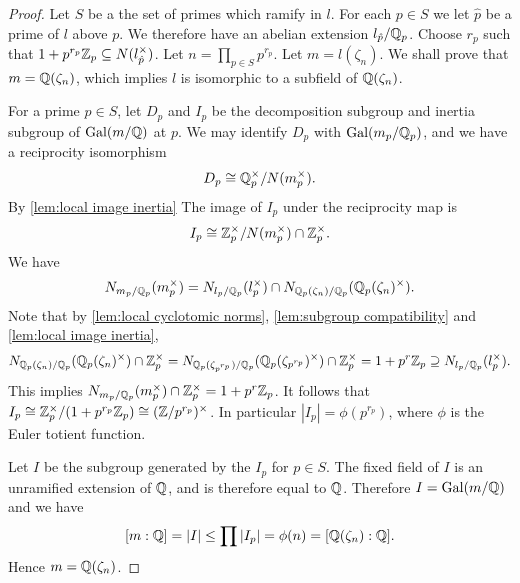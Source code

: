 \begin{proof}
	Let $S$ be a the set of primes which ramify in $l$.
	For each $p \in S$ we let $\hat p$ be a prime of $l$ above $p$.
	We therefore have an abelian extension $l_{\hat p} / {\mathbb Q}_p$.
	Choose $r_p$ such that $1+p^{r_p} {\mathbb Z}_p \subseteq N(l_{\hat p}^\times)$.
	Let $n = \prod_{p \in S} p^{r_p}$.
	Let $m = l(\zeta_n)$.
	We shall prove that $m = {\mathbb Q}(\zeta_n)$, which implies $l$ is
	isomorphic to a subfield of ${\mathbb Q}(\zeta_n)$.

	For a prime $p \in S$, let $D_p$ and $I_p$ be the decomposition subgroup and inertia subgroup of
	$\mathrm{Gal}(m/{\mathbb Q})$ at $p$. We may identify $D_p$ with $\mathrm{Gal}(m_p / {\mathbb Q}_p)$, and we have a reciprocity
	isomorphism
	\[
		D_p \cong {\mathbb Q}_p^\times / N(m_p^\times).
	\]
	By \ref{lem:local image inertia} The image of $I_p$ under the reciprocity map is
	\[
		I_p \cong {\mathbb Z}_p^\times / N(m_p^\times) \cap {\mathbb Z}_p^\times.
	\]
	We have
	\[
		N_{m_p/{\mathbb Q}_p} (m_p^\times)
		=
		N_{l_p/{\mathbb Q}_p} (l_p^\times) \cap N_{{\mathbb Q}_p(\zeta_n) / {\mathbb Q}_p} ({\mathbb Q}_p(\zeta_n)^\times).
	\]
	Note that by \ref{lem:local cyclotomic norms}, \ref{lem:subgroup compatibility}
	and \ref{lem:local image inertia},
	\[
		N_{{\mathbb Q}_p(\zeta_n) / {\mathbb Q}_p} ({\mathbb Q}_p(\zeta_n)^\times) \cap {\mathbb Z}_p^\times =
		N_{{\mathbb Q}_p(\zeta_{p^{r_p}}) / {\mathbb Q}_p} ({\mathbb Q}_p(\zeta_{p^{r_p}})^\times) \cap {\mathbb Z}_p^\times =
		1+p^r {\mathbb Z}_p
		\supseteq N_{l_p/{\mathbb Q}_p} (l_p^\times).
	\]
	This implies $N_{m_p/{\mathbb Q}_p} (m_p^\times) \cap {\mathbb Z}_p^\times = 1+p^r {\mathbb Z}_p$.
	It follows that $I_p \cong {\mathbb Z}_p^\times / (1+p^{r_p} {\mathbb Z}_p) \cong ({\mathbb Z} / p^{r_p})^\times$.
	In particular $|I_p| = \phi(p^{r_p})$, where $\phi$ is the Euler totient function.

	Let $I$ be the subgroup generated by the $I_p$ for $p \in S$.
	The fixed field of $I$ is an unramified extension of ${\mathbb Q}$, and is therefore equal to ${\mathbb Q}$.
	Therefore $I = \mathrm{Gal}(m/{\mathbb Q})$ and we have
	\[
		 [m : {\mathbb Q}] = |I| \le \prod |I_p| = \phi(n) = [{\mathbb Q}(\zeta_n) : {\mathbb Q}].
	\]
	Hence $m = {\mathbb Q}(\zeta_n)$.
\end{proof}

